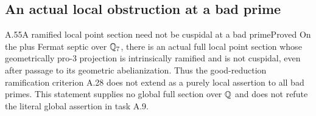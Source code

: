 \subsection{An actual local obstruction at a bad prime}

\begin{statement}{A.55}{A ramified local point section need not be cuspidal at a bad prime}{Proved}
On the plus Fermat septic over $\mathbb Q_7$, there is an actual full local
point section whose geometrically pro-$3$ projection is intrinsically
ramified and is not cuspidal, even after passage to its geometric
abelianization. Thus the good-reduction ramification criterion A.28
does not extend as a purely local assertion to all bad primes.
This statement supplies no global full section over $\mathbb Q$ and does not
refute the literal global assertion in task A.9.
\end{statement}
